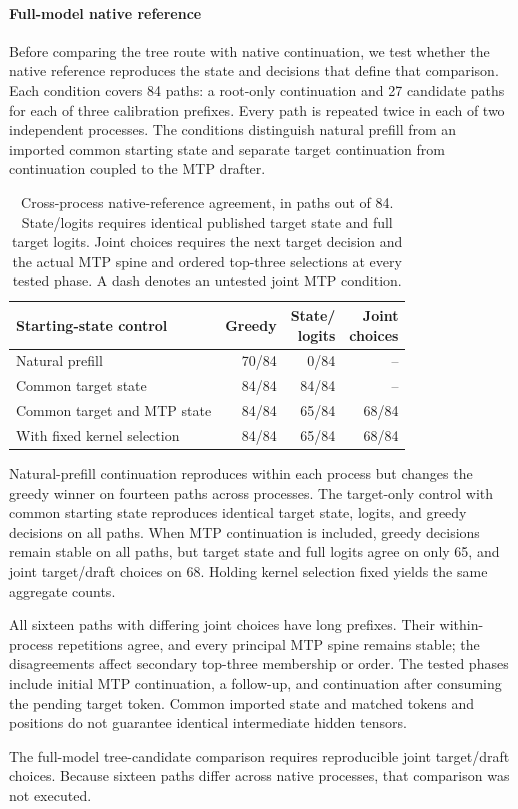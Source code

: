 \paragraph{Full-model native reference}
Before comparing the tree route with native continuation, we test whether the native reference reproduces the state and decisions that define that comparison. Each condition covers 84 paths: a root-only continuation and 27 candidate paths for each of three calibration prefixes. Every path is repeated twice in each of two independent processes. The conditions distinguish natural prefill from an imported common starting state and separate target continuation from continuation coupled to the MTP drafter.

\begin{table}[t]
\caption{Cross-process native-reference agreement, in paths out of 84. State/logits requires identical published target state and full target logits. Joint choices requires the next target decision and the actual MTP spine and ordered top-three selections at every tested phase. A dash denotes an untested joint MTP condition.}
\label{tab:native-continuation}
\centering\footnotesize
\setlength{\tabcolsep}{3pt}
\begin{tabularx}{\columnwidth}{@{}Xrrr@{}}
\toprule
Starting-state control & Greedy & \shortstack{State/\\logits} & \shortstack{Joint\\choices} \\
\midrule
Natural prefill & 70/84 & 0/84 & -- \\
Common target state & 84/84 & 84/84 & -- \\
Common target and MTP state & 84/84 & 65/84 & 68/84 \\
\quad With fixed kernel selection & 84/84 & 65/84 & 68/84 \\
\bottomrule
\end{tabularx}
\end{table}

Natural-prefill continuation reproduces within each process but changes the greedy winner on fourteen paths across processes. The target-only control with common starting state reproduces identical target state, logits, and greedy decisions on all paths. When MTP continuation is included, greedy decisions remain stable on all paths, but target state and full logits agree on only 65, and joint target/draft choices on 68. Holding kernel selection fixed yields the same aggregate counts.

All sixteen paths with differing joint choices have long prefixes. Their within-process repetitions agree, and every principal MTP spine remains stable; the disagreements affect secondary top-three membership or order. The tested phases include initial MTP continuation, a follow-up, and continuation after consuming the pending target token. Common imported state and matched tokens and positions do not guarantee identical intermediate hidden tensors. 

The full-model tree-candidate comparison requires reproducible joint target/draft choices. Because sixteen paths differ across native processes, that comparison was not executed.
